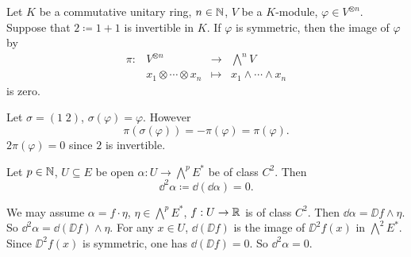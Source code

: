 \begin{propositionenv}
    Let $K$ be a commutative unitary ring, $n \in \mathbb{N}$, $V$ be a $K$-module, $\varphi \in V^{\otimes n}$.
    Suppose that $2 \coloneq 1+1$ is invertible in $K$.
    If $\varphi$ is symmetric, then the image of $\varphi$ by
    $$\begin{array}{rrcl}
        \pi : & V^{\otimes n} & \longrightarrow & \bigwedge^n V\\
        & x_1 \otimes \cdots \otimes x_n & \longmapsto & x_1 \wedge \cdots \wedge x_n
    \end{array}$$
    is zero.
\end{propositionenv}
\begin{proofenv}
    Let $\sigma = (1\;2)$, $\sigma(\varphi) = \varphi$.
    However
    $$\pi(\sigma(\varphi)) = - \pi(\varphi) = \pi(\varphi).$$
    $2 \pi(\varphi) = 0$ since $2$ is invertible.
\end{proofenv}

\begin{propositionenv}
    Let $p \in \mathbb{N}$, $U \subseteq E$ be open $\alpha : U \rightarrow \bigwedge^p E^*$ be of class $C^2$.
    Then
    $$\dd^2 \alpha \coloneq \dd(\dd \alpha) = 0.$$
\end{propositionenv}
\begin{proofenv}
    We may assume $\alpha = f \cdot \eta$, $\eta \in \bigwedge^p E^*$, $f : U \rightarrow \mathbb{R}$ is of class $C^2$.
    Then $\dd \alpha = \DD f \wedge \eta$.
    So $\dd^2 \alpha = \dd (\DD f) \wedge \eta$.
    For any $x \in U$, $\dd(\DD f)$ is the image of $\DD^2 f(x)$ in $\bigwedge^2 E^*$.
    Since $\DD^2f (x)$ is symmetric, one has $\dd(\DD f) = 0$.
    So $\dd^2 \alpha = 0$.
\end{proofenv}

